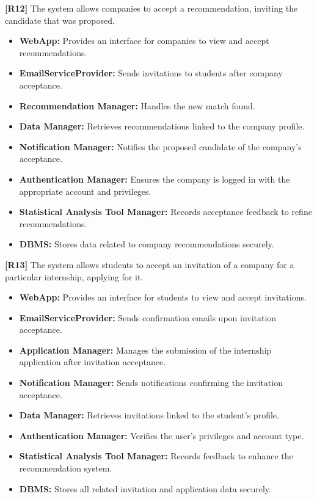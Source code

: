 \textbf{[R12]} The system allows companies to accept a recommendation, inviting the candidate that was proposed.
\begin{itemize}
    \item \textbf{WebApp:} Provides an interface for companies to view and accept recommendations.
    \item \textbf{EmailServiceProvider:} Sends invitations to students after company acceptance.
    \item \textbf{Recommendation Manager:} Handles the new match found.
    \item \textbf{Data Manager:} Retrieves recommendations linked to the company profile.
    \item \textbf{Notification Manager:} Notifies the proposed candidate of the company's acceptance.
    \item \textbf{Authentication Manager:} Ensures the company is logged in with the appropriate account and privileges.
    \item \textbf{Statistical Analysis Tool Manager:} Records acceptance feedback to refine recommendations.
    \item \textbf{DBMS:} Stores data related to company recommendations securely.
\end{itemize}

\textbf{[R13]} The system allows students to accept an invitation of a company for a particular internship, applying for it.
\begin{itemize}
    \item \textbf{WebApp:} Provides an interface for students to view and accept invitations.
    \item \textbf{EmailServiceProvider:} Sends confirmation emails upon invitation acceptance.
    \item \textbf{Application Manager:} Manages the submission of the internship application after invitation acceptance.
    \item \textbf{Notification Manager:} Sends notifications confirming the invitation acceptance.
    \item \textbf{Data Manager:} Retrieves invitations linked to the student's profile.
    \item \textbf{Authentication Manager:} Verifies the user's privileges and account type.
    \item \textbf{Statistical Analysis Tool Manager:} Records feedback to enhance the recommendation system.
    \item \textbf{DBMS:} Stores all related invitation and application data securely.
\end{itemize}

